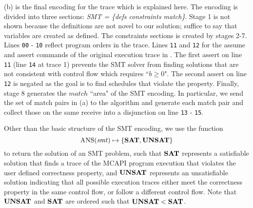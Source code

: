 (b) is the final encoding for the trace which is
explained here. The encoding is divided into three sections:
\textit{SMT = \{defs constraints match\}}. Stage 1 is not shown
because the definitions are not novel to our solution; suffice to say
that variables are created as defined. The constraints sections is created by stages 2-7. Lines \texttt{00} - \texttt{10} reflect program orders in the trace. Lines \texttt{11} and \texttt{12} for the assume and assert commands of the original execution trace in . The first assert on line \texttt{11} (line \texttt{14} at trace 1) prevents the SMT solver from finding solutions that are not consistent with control flow which requires ``$b \ge 0$". The second assert on line \texttt{12} is negated as the goal is to find schedules that violate the property. Finally, stage 8 generates the $\mathit{match}$ ``area" of the SMT encoding. In particular, we send the set of match pairs in (a) to the algorithm and generate each match pair and collect those on the same receive into a disjunction on line \texttt{13} - \texttt{15}.

Other than the basic structure of the SMT encoding, we use the function
\[\mathrm{ANS}(\mathit{smt}) \mapsto \{\mathrm{\textbf{SAT}},\mathrm{\textbf{UNSAT}}\} \]
to return the solution of an SMT problem, such that $\mathrm{\textbf{SAT}}$ represents a satisfiable solution that finds a trace of the MCAPI program execution that violates the user defined correctness property, and $\mathrm{\textbf{UNSAT}}$ represents an unsatisfiable solution indicating that all possible execution traces either meet the correctness property in the same control flow, or follow a different control flow. Note that $\mathrm{\textbf{UNSAT}}$ and $\mathrm{\textbf{SAT}}$ are ordered such that $\mathrm{\textbf{UNSAT}} < \mathrm{\textbf{SAT}}$.

